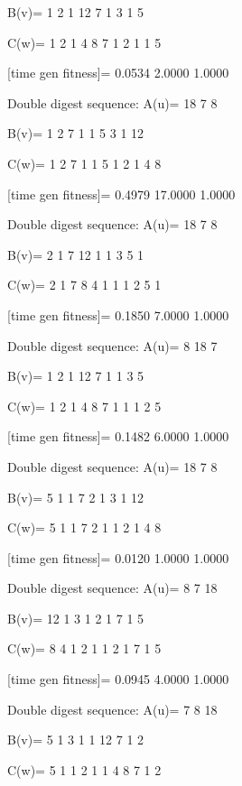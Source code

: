 B(v)=
     1     2     1    12     7     1     3     1     5

C(w)=
     1     2     1     4     8     7     1     2     1     1     5

[time gen fitness]=
    0.0534    2.0000    1.0000

Double digest sequence:
A(u)=
    18     7     8

B(v)=
     1     2     7     1     1     5     3     1    12

C(w)=
     1     2     7     1     1     5     1     2     1     4     8

[time gen fitness]=
    0.4979   17.0000    1.0000

Double digest sequence:
A(u)=
    18     7     8

B(v)=
     2     1     7    12     1     1     3     5     1

C(w)=
     2     1     7     8     4     1     1     1     2     5     1

[time gen fitness]=
    0.1850    7.0000    1.0000

Double digest sequence:
A(u)=
     8    18     7

B(v)=
     1     2     1    12     7     1     1     3     5

C(w)=
     1     2     1     4     8     7     1     1     1     2     5

[time gen fitness]=
    0.1482    6.0000    1.0000

Double digest sequence:
A(u)=
    18     7     8

B(v)=
     5     1     1     7     2     1     3     1    12

C(w)=
     5     1     1     7     2     1     1     2     1     4     8

[time gen fitness]=
    0.0120    1.0000    1.0000

Double digest sequence:
A(u)=
     8     7    18

B(v)=
    12     1     3     1     2     1     7     1     5

C(w)=
     8     4     1     2     1     1     2     1     7     1     5

[time gen fitness]=
    0.0945    4.0000    1.0000

Double digest sequence:
A(u)=
     7     8    18

B(v)=
     5     1     3     1     1    12     7     1     2

C(w)=
     5     1     1     2     1     1     4     8     7     1     2

